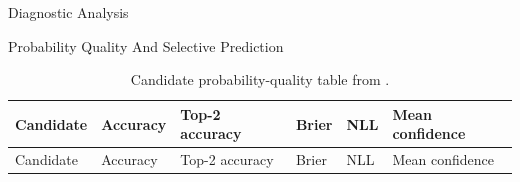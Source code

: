 \documentclass[
  ignorenonframetext,
]{beamer}
\begin{document}
\begin{frame}{Diagnostic Analysis}
\begin{block}{Probability Quality And Selective Prediction}
\begin{longtable}[]{@{}
  >{\raggedright\arraybackslash}p{}
  >{\raggedright\arraybackslash}p{}
  >{\raggedright\arraybackslash}p{}
  >{\raggedright\arraybackslash}p{}
  >{\raggedright\arraybackslash}p{}
  >{\raggedright\arraybackslash}p{}@{}}
\caption{Candidate probability-quality table from
\protect{}.}\label{tbl:probability-quality}\tabularnewline
\toprule\noalign{}
\begin{minipage}[b]{\linewidth}\raggedright
Candidate
\end{minipage} & \begin{minipage}[b]{\linewidth}\raggedright
Accuracy
\end{minipage} & \begin{minipage}[b]{\linewidth}\raggedright
Top-2 accuracy
\end{minipage} & \begin{minipage}[b]{\linewidth}\raggedright
Brier
\end{minipage} & \begin{minipage}[b]{\linewidth}\raggedright
NLL
\end{minipage} & \begin{minipage}[b]{\linewidth}\raggedright
Mean confidence
\end{minipage} \\
\midrule\noalign{}
\endfirsthead
\toprule\noalign{}
\begin{minipage}[b]{\linewidth}\raggedright
Candidate
\end{minipage} & \begin{minipage}[b]{\linewidth}\raggedright
Accuracy
\end{minipage} & \begin{minipage}[b]{\linewidth}\raggedright
Top-2 accuracy
\end{minipage} & \begin{minipage}[b]{\linewidth}\raggedright
Brier
\end{minipage} & \begin{minipage}[b]{\linewidth}\raggedright
NLL
\end{minipage} & \begin{minipage}[b]{\linewidth}\raggedright
Mean confidence
\end{minipage} \\

\end{longtable}
\end{block}
\end{frame}
\end{document}

